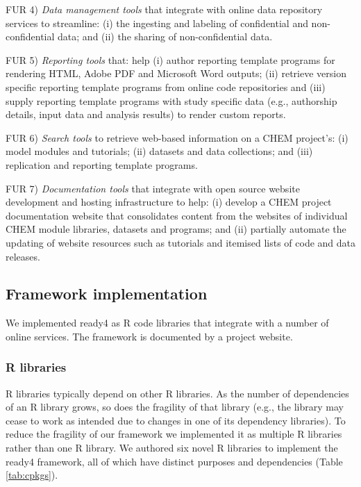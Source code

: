 \documentclass[sn-vancouver,Numbered,pdflatex]{sn-jnl}
\theoremstyle{remark}
\theoremstyle{definition}
\begin{document}
FUR 4) \emph{Data management tools} that integrate with online data repository services to streamline: (i) the ingesting and labeling of confidential and non-confidential data; and (ii) the sharing of non-confidential data.

FUR 5) \emph{Reporting tools} that: help (i) author reporting template programs for rendering HTML, Adobe PDF and Microsoft Word outputs; (ii) retrieve version specific reporting template programs from online code repositories and (iii) supply reporting template programs with study specific data (e.g., authorship details, input data and analysis results) to render custom reports.

FUR 6) \emph{Search tools} to retrieve web-based information on a CHEM project's: (i) model modules and tutorials; (ii) datasets and data collections; and (iii) replication and reporting template programs.

FUR 7) \emph{Documentation tools} that integrate with open source website development and hosting infrastructure to help: (i) develop a CHEM project documentation website that consolidates content from the websites of individual CHEM module libraries, datasets and programs; and (ii) partially automate the updating of website resources such as tutorials and itemised lists of code and data releases.

\hypertarget{framework-implementation}{%
\subsection{Framework implementation}\label{framework-implementation}}

We implemented ready4 as R \citep{RCORE2022} code libraries that integrate with a number of online services. The framework is documented by a project website.

\hypertarget{r-libraries}{%
\subsubsection{R libraries}\label{r-libraries}}

R libraries typically depend on other R libraries. As the number of dependencies of an R library grows, so does the fragility of that library (e.g., the library may cease to work as intended due to changes in one of its dependency libraries). To reduce the fragility of our framework we implemented it as multiple R libraries rather than one R library. We authored six novel R libraries to implement the ready4 framework, all of which have distinct purposes and dependencies (Table \ref{tab:cpkgs}).
\end{document}

